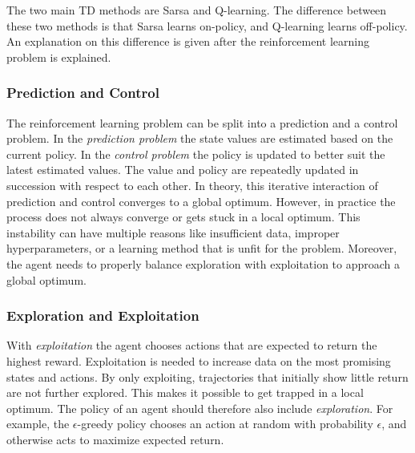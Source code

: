 The two main TD methods are Sarsa and Q-learning. The difference between these two methods is that Sarsa learns on-policy, and Q-learning learns off-policy. An explanation on this difference is given after the reinforcement learning problem is explained. %


\subsubsection*{Prediction and Control}

The reinforcement learning problem can be split into a prediction and a control problem. In the \textit{prediction problem} the state values are estimated based on the current policy. In the \textit{control problem} the policy is updated to better suit the latest estimated values. The value and policy are repeatedly updated in succession with respect to each other. In theory, this iterative interaction of prediction and control converges to a global optimum. However, in practice the process does not always converge or gets stuck in a local optimum. This instability can have multiple reasons like insufficient data, improper hyperparameters, or a learning method that is unfit for the problem. Moreover, the agent needs to properly balance exploration with exploitation to approach a global optimum. 

\subsubsection*{Exploration and Exploitation}

With \textit{exploitation} the agent chooses actions that are expected to return the highest reward. Exploitation is needed to increase data on the most promising states and actions. By only exploiting, trajectories that initially show little return are not further explored. This makes it possible to get trapped in a local optimum. The policy of an agent should therefore also include \textit{exploration}. For example, the $\epsilon$-greedy policy chooses an action at random with probability $\epsilon$, and otherwise acts to maximize expected return.

